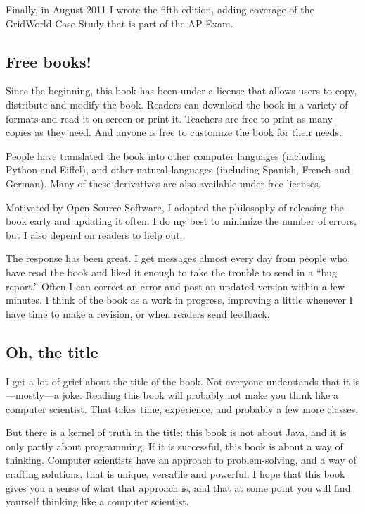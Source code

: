 Finally, in August 2011 I wrote the fifth edition, adding
coverage of the GridWorld Case Study that is part of the AP Exam.


\subsection*{Free books!}

Since the beginning, this book has been under a license that allows users
to copy, distribute and modify the book.  Readers can download the
book in a variety of formats and read it on screen or print it.
Teachers are free to print as many copies as they need.  And anyone is
free to customize the book for their needs.

People have translated the book into other computer languages
(including Python and Eiffel), and other natural languages (including
Spanish, French and German).  Many of these derivatives are also
available under free licenses.

Motivated by Open
Source Software, I adopted the philosophy of releasing the
book early and updating it often.  I do my best to minimize the
number of errors, but I also depend on readers to help out.

The response has been great.  I get messages almost every day from
people who have read the book and liked it enough to take the trouble
to send in a ``bug report.''  Often I can correct an error
and post an updated version within a few minutes.  I think of the
book as a work in progress, improving a little whenever I have time
to make a revision, or when readers send feedback.

\subsection*{Oh, the title}

I get a lot of grief about the title of the book.  Not everyone
understands that it is---mostly---a joke.
Reading this book will probably not make you think like a computer
scientist.  That takes time, experience, and probably a few more
classes.

But there is a kernel of truth in the title: this book is not
about Java, and it is only partly about programming.  If it is
successful, this book is about a way of thinking.  Computer scientists
have an approach to problem-solving, and a way of crafting solutions,
that is unique, versatile and powerful.  I hope that this book
gives you a sense of what that approach is, and that at some
point you will find yourself thinking like a computer scientist.

